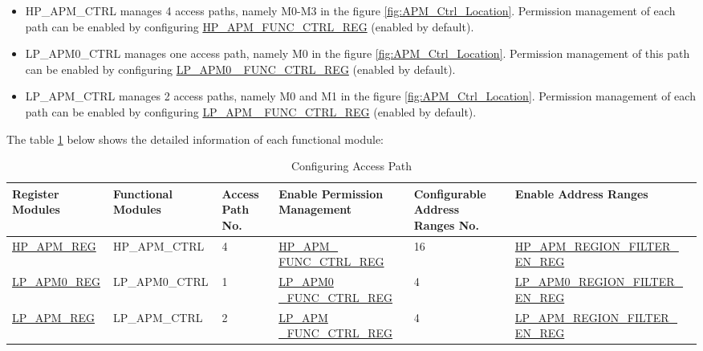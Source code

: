 \documentclass[main\_\_EN.tex]{subfiles}
\begin{document}
\begin{itemize}
    \item HP\_APM\_CTRL manages 4 access paths, namely M0-M3 in the figure \ref{fig:APM_Ctrl_Location}. Permission management of each path can be enabled by configuring \hyperref[regdesc:HPAPMFUNCCTRLREG]{HP\_APM\_FUNC\_CTRL\_REG} (enabled by default).
    
    \item LP\_APM0\_CTRL manages one access path, namely M0 in the figure \ref{fig:APM_Ctrl_Location}. Permission management of this path can be enabled by configuring \hyperref[regdesc:LPAPM0FUNCCTRLREG]{LP\_APM0 \_FUNC\_CTRL\_REG} (enabled by default).
    
    \item LP\_APM\_CTRL manages 2 access paths, namely M0 and M1 in the figure \ref{fig:APM_Ctrl_Location}. Permission management of each path can be enabled by configuring \hyperref[regdesc:LPAPMFUNCCTRLREG]{LP\_APM \_FUNC\_CTRL\_REG} (enabled by default).
\end{itemize}

The table \ref{tab:apm-reg} below shows the detailed information of each functional module:

\begin{longtable}[C]{|p{2.5cm}|p{2.5cm}|p{1.5cm}|p{3cm}|p{2cm}|p{4.5cm}|}
    \caption{Configuring Access Path}
    \label{tab:apm-reg}\\\hline 
    \rowcolor{lightgray}
    \textbf{Register Modules} & \textbf{Functional Modules} & \textbf{Access Path No.} & \textbf{Enable Permission Management} & \textbf{Configurable Address Ranges No.} & \textbf{Enable Address Ranges}\\ \hline 
    \endfirsthead
    \endlastfoot
    
    \hyperref[sec:permctrl-reg-hp]{HP\_APM\_REG} & HP\_APM\_CTRL & 4 &\hyperref[regdesc:HPAPMFUNCCTRLREG]{HP\_APM\_ FUNC\_CTRL\_REG} & 16 & \hyperref[fielddesc:HPAPMREGIONFILTEREN]{HP\_APM\_REGION\_FILTER\_ EN\_REG}\\ \hline 
    
    \hyperref[sec:permctrl-reg-lp0]{LP\_APM0\_REG} & LP\_APM0\_CTRL & 1 & \hyperref[regdesc:LPAPM0FUNCCTRLREG]{LP\_APM0 \_FUNC\_CTRL\_REG} & 4 & \hyperref[fielddesc:LPAPM0REGIONFILTEREN]{LP\_APM0\_REGION\_FILTER\_ EN\_REG}\\ \hline 
    
    \hyperref[sec:permctrl-reg-lp]{LP\_APM\_REG} & LP\_APM\_CTRL & 2 & \hyperref[regdesc:LPAPMFUNCCTRLREG]{LP\_APM \_FUNC\_CTRL\_REG} & 4 & \hyperref[fielddesc:LPAPMREGIONFILTEREN]{LP\_APM\_REGION\_FILTER\_ EN\_REG}\\ \hline 
    
\end{longtable}
\end{document}
